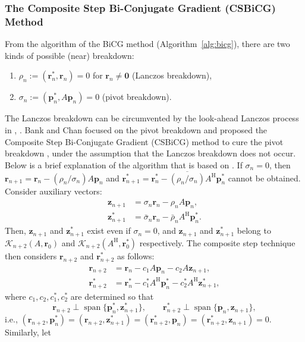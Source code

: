 \subsubsection{{The Composite Step Bi-Conjugate Gradient (CSBiCG) Method}}\label{subsec:composite-step-bicg}
{From the algorithm of the BiCG method (Algorithm\ \ref{alg:bicg}), there are two kinds of possible (near) breakdown:}
\begin{enumerate}
\item $\rho_n:=(\bm r_n^{*},\bm r_n)=0$ {for $\bm r_n\ne\bm0$ (Lanczos breakdown),}
\item $\sigma_n:=(\bm p_n^{*},A\bm p_n)=0$ ({pivot breakdown}).
\end{enumerate}
{The Lanczos breakdown can be circumvented by the look-ahead Lanczos process in , . Bank and Chan focused on the pivot breakdown and proposed the Composite Step Bi-Conjugate Gradient (CSBiCG) method to cure the pivot breakdown ,  under the assumption that the Lanczos breakdown does not occur. Below is a brief explanation of the algorithm that is based on .}
{If $\sigma_n=0$, then $\bm r_{n+1}=\bm r_n-(\rho_n/\sigma_n)A\bm p_n$ and $\bm r_{n+1}^{*}=\bm r_n^{*}-\overline{(\rho_n/\sigma_n)}A^{\mathrm H}\bm p_n^{*}$ cannot be obtained. Consider auxiliary vectors:}
\[\begin{aligned}\bm z_{n+1}&=\sigma_n\bm r_n-\rho_nA\bm p_n,\\\bm z_{n+1}^{*}&=\bar\sigma_n\bm r_n-\bar\rho_nA^{\mathrm H}\bm p_n^{*}.\end{aligned}\]
{Then, $\bm z_{n+1}$ and $\bm z_{n+1}^{*}$ exist even if $\sigma_n=0$, and $\bm z_{n+1}$ and $\bm z_{n+1}^{*}$ belong to $\mathcal K_{n+2}(A,\bm r_0)$ and $\mathcal K_{n+2}(A^{\mathrm H},\bm r_0^{*})$ respectively. The composite step technique then considers $\bm r_{n+2}$ and $\bm r_{n+2}^{*}$ as follows:}
\[\begin{aligned}\bm r_{n+2}&=\bm r_n-c_1A\bm p_n-c_2A\bm z_{n+1},\\\bm r_{n+2}^{*}&=\bm r_n^{*}-c_1^{*}A^{\mathrm H}\bm p_n^{*}-c_2^{*}A^{\mathrm H}\bm z_{n+1}^{*},\end{aligned}\]
{where $c_1,c_2,c_1^{*},c_2^{*}$ are determined so that}
\[\bm r_{n+2}\perp\operatorname{span}\{\bm p_n^{*},\bm z_{n+1}^{*}\},\qquad\bm r_{n+2}^{*}\perp\operatorname{span}\{\bm p_n,\bm z_{n+1}\},\]
{i.e., $(\bm r_{n+2},\bm p_n^{*})=(\bm r_{n+2},\bm z_{n+1}^{*})=(\bm r_{n+2}^{*},\bm p_n)=(\bm r_{n+2}^{*},\bm z_{n+1})=0$. Similarly, let}
